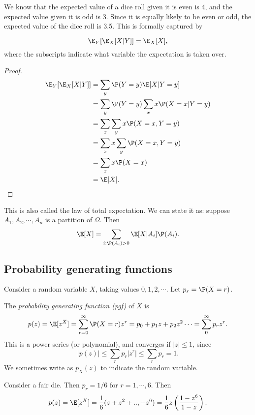 \documentclass[a4paper]{article}
\begin{document}
We know that the expected value of a dice roll given it is even is 4, and the expected value given it is odd is 3. Since it is equally likely to be even or odd, the expected value of the dice roll is 3.5. This is formally captured by
\begin{thm}
  \[
    \E_Y[\E_X[X|Y]] = \E_X[X],
  \]
  where the subscripts indicate what variable the expectation is taken over.
\end{thm}

\begin{proof}
  \begin{align*}
    \E_Y[\E_X[X|Y]] &= \sum_y \P(Y = y)\E[X|Y = y]\\
    &= \sum _y \P(Y = y) \sum_{x}x\P(X = x|Y = y)\\
    &= \sum_x\sum_y x\P(X = x, Y = y)\\
    &= \sum _x x\sum_y \P(X = x, Y = y)\\
    &= \sum_x x\P(X = x)\\
    &= \E[X].
  \end{align*}
\end{proof}
This is also called the law of total expectation. We can state it as: suppose $A_1, A_2, \cdots, A_n$ is a partition of $\Omega$. Then
\[
  \E[X] = \sum_{i: \P(A_i) > 0}\E[X|A_i]\P(A_i).
\]

\subsection{Probability generating functions}
Consider a random variable $X$, taking values $0, 1, 2, \cdots$. Let $p_r = \P(X = r)$.
\begin{defi}
  The \emph{probability generating function (pgf)} of $X$ is
  \[
    p(z) = \E[z^X] = \sum_{r = 0}^\infty \P(X = r)z^r = p_0 + p_1z + p_2z^2\cdots = \sum_0^\infty p_rz^r.
  \]
  This is a power series (or polynomial), and converges if $|z| \leq 1$, since
  \[
    |p(z)| \leq \sum_r p_r |z^r| \leq \sum_r p_r = 1.
  \]
  We sometimes write as $p_X(z)$ to indicate the random variable.
\end{defi}

\begin{eg}
  Consider a fair die. Then $p_r = 1/6$ for $r = 1, \cdots, 6$. Then
  \[
    p(z) = \E[z^X] = \frac{1}{6}(z + z^2 + .., + z^6) = \frac{1}{6}z\left(\frac{1 - z^6}{1 - z}\right).
  \]
\end{eg}
\end{document}
